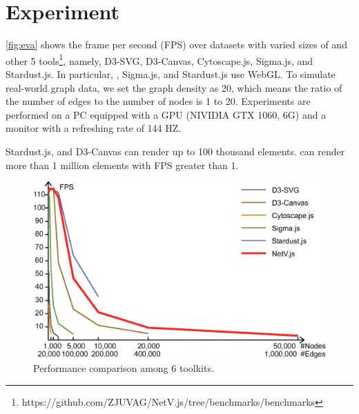 \section{Experiment}\label{sec:experiment}
\autoref{fig:eva} shows the frame per second (FPS) over datasets with varied sizes of \name and other 5 tools\footnote{https://github.com/ZJUVAG/NetV.js/tree/benchmarks/benchmarks}, namely,  %
D3-SVG, D3-Canvas, Cytoscape.js, Sigma.js, and Stardust.js. In particular, \name, Sigma.js, and Stardust.js use WebGL. To simulate real-world graph data, we set the graph density as 20, which means the ratio of the number of edges to the number of nodes is 1 to 20. 
Experiments are performed on a PC equipped with a GPU (NIVIDIA GTX 1060, 6G) and a monitor with a refreshing rate of 144 HZ.

Stardust.js, and D3-Canvas can render up to 100 thousand elements. \name can render more than 1 million elements with FPS greater than 1.

\begin{figure}[htbp]
    \includegraphics[width=\linewidth]{fig/eva.eps}
    \caption{
        Performance comparison among 6 toolkits.
    }
    \label{fig:eva}
\end{figure}
